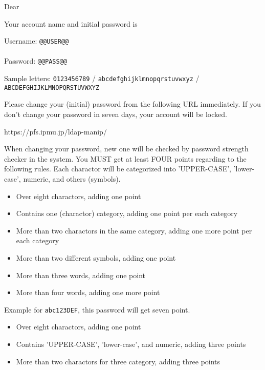 \documentclass[12pt]{article}
\begin{document}
Dear 

Your account name and initial password is

\begin{center}
Username: {\Huge{\tt \verb|@@USER@@|}} \\
\ \\
Password: {\Huge{\tt \verb|@@PASS@@|}}
\end{center}

Sample letters: 
{\tt 0123456789} / 
{\tt abcdefghijklmnopqrstuvwxyz} / 
{\tt ABCDEFGHIJKLMNOPQRSTUVWXYZ}

 

Please change your (initial) password from the following URL immediately.
If you don't change your password in seven days, 
your account will be locked.

https://pfs.ipmu.jp/ldap-manip/

 

When changing your password, new one will be checked by password strength 
checker in the system.
You MUST get at least FOUR points regarding to the following rules.
Each charactor will be categorized into 'UPPER-CASE', 'lower-case', numeric, and 
others (symbols).

\begin{itemize}
  \item Over eight charactors, adding one point
  \item Contains one (charactor) category, adding one point per each category
  \item More than two charactors in the same category, adding one more point per each category
  \item More than two different symbols, adding one point
  \item More than three words, adding one point
  \item More than four words, adding one more point
\end{itemize}

Example for {\tt abc123DEF}, this password will get seven point.

\begin{itemize}
  \item Over eight charactors, adding one point
  \item Contains 'UPPER-CASE', 'lower-case', and numeric, adding three points
  \item More than two charactors for three category, adding three points
\end{itemize}
\end{document}
